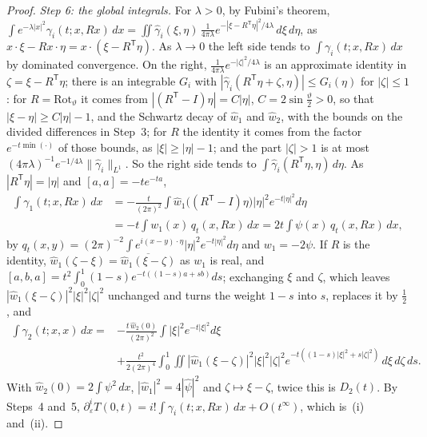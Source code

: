 \documentclass[pdflatex,sn-mathphys-num]{sn-jnl}
\theoremstyle{thmstyleone}%
\theoremstyle{thmstylethree}%
\begin{document}
\begin{appendices}
\begin{proof}
\emph{Step 6: the global integrals.} For $\lambda>0$, by Fubini's theorem, $\int e^{-\lambda|x|^2}\gamma_i(t;x,Rx)\,dx=\iint\hat\gamma_i(\xi,\eta)\,\frac{1}{4\pi\lambda}e^{-|\xi-R^{\mathsf T}\eta|^2/4\lambda}\,d\xi\,d\eta$, as $x\cdot\xi-Rx\cdot\eta=x\cdot(\xi-R^{\mathsf T}\eta)$. As $\lambda\to0$ the left side tends to $\int\gamma_i(t;x,Rx)\,dx$ by dominated convergence. On the right, $\frac1{4\pi\lambda}e^{-|\zeta|^2/4\lambda}$ is an approximate identity in $\zeta=\xi-R^{\mathsf T}\eta$; there is an integrable $G_i$ with $|\hat\gamma_i(R^{\mathsf T}\eta+\zeta,\eta)|\le G_i(\eta)$ for $|\zeta|\le1$: for $R=\mathrm{Rot}_\vartheta$ it comes from $|(R^{\mathsf T}-I)\eta|=C|\eta|$, $C=2\sin\frac\vartheta2>0$, so that $|\xi-\eta|\ge C|\eta|-1$, and the Schwartz decay of $\hat w_1$ and $\hat w_2$, with the bounds on the divided differences in Step~3; for $R$ the identity it comes from the factor $e^{-t\min(\cdot)}$ of those bounds, as $|\xi|\ge|\eta|-1$; and the part $|\zeta|>1$ is at most $(4\pi\lambda)^{-1}e^{-1/4\lambda}\|\hat\gamma_i\|_{L^1}$. So the right side tends to $\int\hat\gamma_i(R^{\mathsf T}\eta,\eta)\,d\eta$. As $|R^{\mathsf T}\eta|=|\eta|$ and $[a,a]=-te^{-ta}$,
\[
\begin{aligned}
\int\gamma_1(t;x,Rx)\,dx&=-\frac t{(2\pi)^2}\int\hat w_1\bigl((R^{\mathsf T}-I)\eta\bigr)|\eta|^2e^{-t|\eta|^2}d\eta\\
&=-t\int w_1(x)\,q_t(x,Rx)\,dx=2t\int\psi(x)\,q_t(x,Rx)\,dx,
\end{aligned}
\]
by $q_t(x,y)=(2\pi)^{-2}\int e^{i(x-y)\cdot\eta}|\eta|^2e^{-t|\eta|^2}d\eta$ and $w_1=-2\psi$. If $R$ is the identity, $\hat w_1(\zeta-\xi)=\overline{\hat w_1(\xi-\zeta)}$ as $w_1$ is real, and $[a,b,a]=t^2\int_0^1(1-s)e^{-t((1-s)a+sb)}ds$; exchanging $\xi$ and $\zeta$, which leaves $|\hat w_1(\xi-\zeta)|^2|\xi|^2|\zeta|^2$ unchanged and turns the weight $1-s$ into $s$, replaces it by $\frac12$, and
\[
\begin{aligned}
\int\gamma_2(t;x,x)\,dx={}&-\frac{t\,\hat w_2(0)}{(2\pi)^2}\int|\xi|^2e^{-t|\xi|^2}d\xi\\
&+\frac{t^2}{2(2\pi)^4}\int_0^1\!\!\iint|\hat w_1(\xi-\zeta)|^2|\xi|^2|\zeta|^2e^{-t((1-s)|\xi|^2+s|\zeta|^2)}\,d\xi\,d\zeta\,ds .
\end{aligned}
\]
With $\hat w_2(0)=2\int\psi^2\,dx$, $|\hat w_1|^2=4|\hat\psi|^2$ and $\zeta\mapsto\xi-\zeta$, twice this is $D_2(t)$. By Steps~4 and~5, $\partial_\varepsilon^iT(0,t)=i!\int\gamma_i(t;x,Rx)\,dx+O(t^\infty)$, which is~(i) and~(ii).
\end{proof}


\end{appendices}
\end{document}
